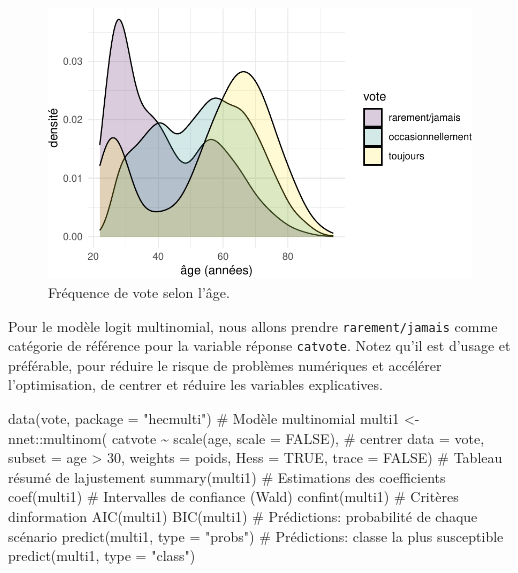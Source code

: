 \documentclass[
  11pt,
  letterpaper,
]{scrbook}
\newenvironment{Shaded}{\begin{snugshade}}{\end{snugshade}}
\newcommand{\AttributeTok}[1]{\textcolor[rgb]{0.40,0.45,0.13}{#1}}
\newcommand{\CommentTok}[1]{\textcolor[rgb]{0.37,0.37,0.37}{#1}}
\newcommand{\ConstantTok}[1]{\textcolor[rgb]{0.56,0.35,0.01}{#1}}
\newcommand{\DecValTok}[1]{\textcolor[rgb]{0.68,0.00,0.00}{#1}}
\newcommand{\FunctionTok}[1]{\textcolor[rgb]{0.28,0.35,0.67}{#1}}
\newcommand{\NormalTok}[1]{\textcolor[rgb]{0.00,0.23,0.31}{#1}}
\newcommand{\OtherTok}[1]{\textcolor[rgb]{0.00,0.23,0.31}{#1}}
\newcommand{\SpecialCharTok}[1]{\textcolor[rgb]{0.37,0.37,0.37}{#1}}
\newcommand{\StringTok}[1]{\textcolor[rgb]{0.13,0.47,0.30}{#1}}
\theoremstyle{definition}
\theoremstyle{remark}
\begin{document}
\begin{figure}[ht!]

{\centering \includegraphics{./05-reglogistique_files/figure-pdf/fig-vote-age-1.pdf}

}

\caption{\label{fig-vote-age}Fréquence de vote selon l'âge.}

\end{figure}

Pour le modèle logit multinomial, nous allons prendre
\texttt{rarement/jamais} comme catégorie de référence pour la variable
réponse \texttt{catvote}. Notez qu'il est d'usage et préférable, pour
réduire le risque de problèmes numériques et accélérer l'optimisation,
de centrer et réduire les variables explicatives.

\begin{Shaded}
\begin{Highlighting}[]
\FunctionTok{data}\NormalTok{(vote, }\AttributeTok{package =} \StringTok{"hecmulti"}\NormalTok{)}
\CommentTok{\# Modèle multinomial}
\NormalTok{multi1 }\OtherTok{\textless{}{-}}\NormalTok{ nnet}\SpecialCharTok{::}\FunctionTok{multinom}\NormalTok{(}
\NormalTok{  catvote }\SpecialCharTok{\textasciitilde{}} \FunctionTok{scale}\NormalTok{(age, }\AttributeTok{scale =} \ConstantTok{FALSE}\NormalTok{), }\CommentTok{\# centrer}
  \AttributeTok{data =}\NormalTok{ vote, }
  \AttributeTok{subset =}\NormalTok{ age }\SpecialCharTok{\textgreater{}} \DecValTok{30}\NormalTok{,}
  \AttributeTok{weights =}\NormalTok{ poids,}
  \AttributeTok{Hess =} \ConstantTok{TRUE}\NormalTok{,}
  \AttributeTok{trace =} \ConstantTok{FALSE}\NormalTok{) }
\CommentTok{\# Tableau résumé de l\textquotesingle{}ajustement}
\FunctionTok{summary}\NormalTok{(multi1)}
\CommentTok{\# Estimations des coefficients}
\FunctionTok{coef}\NormalTok{(multi1)}
\CommentTok{\# Intervalles de confiance (Wald)}
\FunctionTok{confint}\NormalTok{(multi1)}
\CommentTok{\# Critères d\textquotesingle{}information}
\FunctionTok{AIC}\NormalTok{(multi1)}
\FunctionTok{BIC}\NormalTok{(multi1)}
\CommentTok{\# Prédictions: probabilité de chaque scénario}
\FunctionTok{predict}\NormalTok{(multi1, }\AttributeTok{type =} \StringTok{"probs"}\NormalTok{)}
\CommentTok{\# Prédictions: classe la plus susceptible}
\FunctionTok{predict}\NormalTok{(multi1, }\AttributeTok{type =} \StringTok{"class"}\NormalTok{)}
\end{Highlighting}
\end{Shaded}
\end{document}
